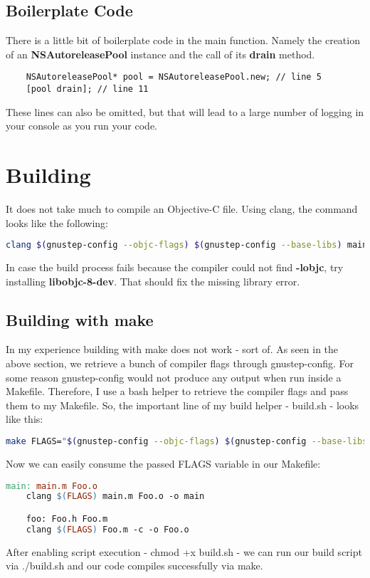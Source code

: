 \documentclass{article}
\begin{document}
  \subsection{Boilerplate Code}
  There is a little bit of boilerplate code in the main function.
  Namely the creation of an \textbf{NSAutoreleasePool} instance and the call of its \textbf{drain} method.
  \begin{lstlisting}
    NSAutoreleasePool* pool = NSAutoreleasePool.new; // line 5
    [pool drain]; // line 11
  \end{lstlisting}
  These lines can also be omitted, but that will lead to a large number of logging in your console as you run your code.
  \newpage
  \section{Building}
  It does not take much to compile an Objective-C file.
  Using clang, the command looks like the following:
  \begin{lstlisting}[language=bash]
    clang $(gnustep-config --objc-flags) $(gnustep-config --base-libs) main.m Foo.m
  \end{lstlisting}
  In case the build process fails because the compiler could not find \textbf{-lobjc}, try installing \textbf{libobjc-8-dev}.
  That should fix the missing library error.
  \subsection{Building with make}
  In my experience building with make does not work - sort of.
  As seen in the above section, we retrieve a bunch of compiler flags through gnustep-config.
  For some reason gnustep-config would not produce any output when run inside a Makefile.
  Therefore, I use a bash helper to retrieve the compiler flags and pass them to my Makefile.
  So, the important line of my build helper - build.sh - looks like this:
  \begin{lstlisting}[language=bash]
    make FLAGS="$(gnustep-config --objc-flags) $(gnustep-config --base-libs)"
  \end{lstlisting}
  Now we can easily consume the passed FLAGS variable in our Makefile:
  \begin{lstlisting}[language=make]
    main: main.m Foo.o
    clang $(FLAGS) main.m Foo.o -o main

    foo: Foo.h Foo.m
    clang $(FLAGS) Foo.m -c -o Foo.o
  \end{lstlisting}
  After enabling script execution - chmod +x build.sh - we can run our build script via ./build.sh and our code compiles successfully via make.
\end{document}
